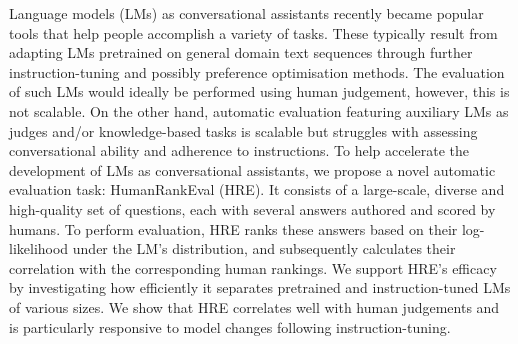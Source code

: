 Language models (LMs) as conversational assistants recently became popular tools that help people accomplish a variety of tasks. These typically result from adapting LMs pretrained on general domain text sequences through further instruction-tuning and possibly preference optimisation methods. The evaluation of such LMs would ideally be performed using human judgement, however, this is not scalable. On the other hand, automatic evaluation featuring auxiliary LMs as judges and/or knowledge-based tasks is scalable but struggles with assessing conversational ability and adherence to instructions. To help accelerate the development of LMs as conversational assistants, we propose a novel automatic evaluation task: HumanRankEval (HRE). It consists of a large-scale, diverse and high-quality set of questions, each with several answers authored and scored by humans. To perform evaluation, HRE ranks these answers based on their log-likelihood under the LM's distribution, and subsequently calculates their correlation with the corresponding human rankings. We support HRE's efficacy by investigating how efficiently it separates pretrained and instruction-tuned LMs of various sizes. We show that HRE correlates well with human judgements and is particularly responsive to model changes following instruction-tuning.